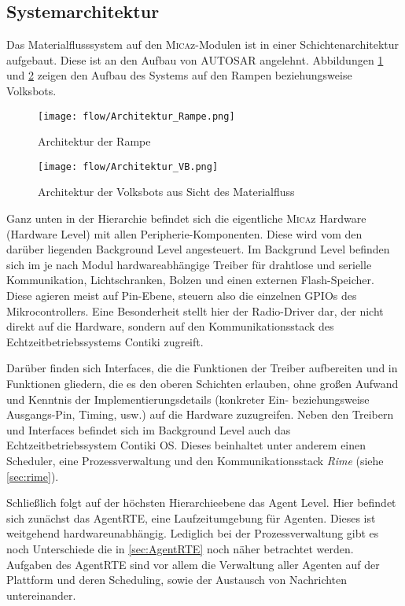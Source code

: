 \subsection{Systemarchitektur}

Das Materialflusssystem auf den \textsc{Mica}z-Modulen ist in einer Schichtenarchitektur aufgebaut. Diese ist an den Aufbau von AUTOSAR \cite{AUTOSAR:2014:Online} angelehnt. Abbildungen \ref{fig:architecture_ramp} und \ref{fig:architecture_vb} zeigen den Aufbau des Systems auf den Rampen beziehungsweise Volksbots.

\begin{figure}[h!]
 \centering
		\texttt{[image: flow/Architektur\_Rampe.png]}
	\caption{Architektur der Rampe \cite{Stasch:Hahn}}
	\label{fig:architecture_ramp}
\end{figure}

\begin{figure}[h!]
 \centering
		\texttt{[image: flow/Architektur\_VB.png]}
	\caption{Architektur der Volksbots aus Sicht des Materialfluss \cite{Stasch:Hahn}}
	\label{fig:architecture_vb}
\end{figure}

Ganz unten in der Hierarchie befindet sich die eigentliche \textsc{Mica}z Hardware (Hardware Level) mit allen Peripherie-Komponenten. Diese wird vom den darüber liegenden Background Level angesteuert. Im Backgrund Level befinden sich im je nach Modul hardwareabhängige Treiber für drahtlose und serielle Kommunikation, Lichtschranken, Bolzen und einen externen Flash-Speicher. Diese agieren meist auf Pin-Ebene, steuern also die einzelnen GPIOs des Mikrocontrollers. Eine Besonderheit stellt hier der Radio-Driver dar, der nicht direkt auf die Hardware, sondern auf den Kommunikationsstack des Echtzeitbetriebssystems Contiki zugreift.

Darüber finden sich Interfaces, die die Funktionen der Treiber aufbereiten und in Funktionen gliedern, die es den oberen Schichten erlauben, ohne großen Aufwand und Kenntnis der Implementierungsdetails (konkreter Ein- beziehungsweise Ausgangs-Pin, Timing, usw.) auf die Hardware zuzugreifen. Neben den Treibern und Interfaces befindet sich im Background Level auch das Echtzeitbetriebssystem Contiki OS. Dieses beinhaltet unter anderem einen Scheduler, eine Prozessverwaltung und den Kommunikationsstack \textit{Rime} (siehe \autoref{sec:rime}). 

Schließlich folgt auf der höchsten Hierarchieebene das Agent Level. Hier befindet sich zunächst das AgentRTE, eine Laufzeitumgebung für Agenten. Dieses ist weitgehend hardwareunabhängig. Lediglich bei der Prozessverwaltung gibt es noch Unterschiede die in \autoref{sec:AgentRTE} noch näher betrachtet werden.
Aufgaben des AgentRTE sind vor allem die Verwaltung aller Agenten auf der Plattform und deren Scheduling, sowie der Austausch von Nachrichten untereinander.

